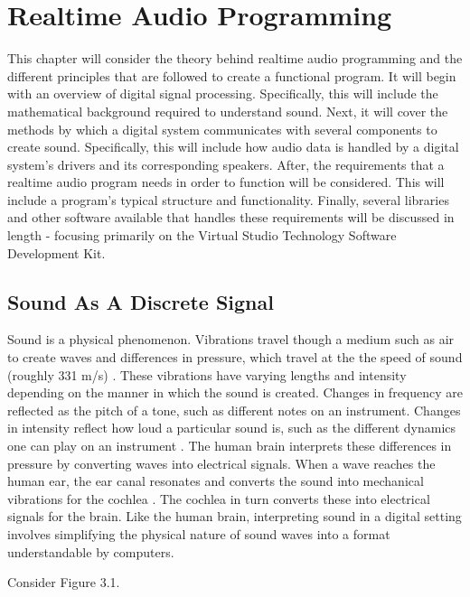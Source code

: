 \chapter{Realtime Audio Programming}
\hspace*{-0.15cm}This chapter will consider the theory behind realtime audio programming and the different principles that are followed to create a functional program. It will begin with an overview of digital signal processing. Specifically, this will include the mathematical background required to understand sound. Next, it will cover the methods by which a digital system communicates with several components to create sound. Specifically, this will include how audio data is handled by a digital system's drivers and its corresponding speakers. After, the requirements that a realtime audio program needs in order to function will be considered. This will include a program's typical structure and functionality. Finally, several libraries and other software available that handles these requirements will be discussed in length - focusing primarily on the Virtual Studio Technology Software Development Kit.

\section{Sound As A Discrete Signal}
Sound is a physical phenomenon. Vibrations travel though a medium such as air to create waves and differences in pressure, which travel at the the speed of sound (roughly 331 m/s) \cite{Ling_2016}. These vibrations have varying lengths and intensity depending on the manner in which the sound is created. Changes in frequency are reflected as the pitch of a tone, such as different notes on an instrument. Changes in intensity reflect how loud a particular sound is, such as the different dynamics one can play on an instrument \cite{Ling_2016}. The human brain interprets these differences in pressure by converting waves into electrical signals. When a wave reaches the human ear, the ear canal resonates and converts the sound into mechanical vibrations for the cochlea \cite{Ling_2016}. The cochlea in turn converts these into electrical signals for the brain. Like the human brain, interpreting sound in a digital setting involves simplifying the physical nature of sound waves into a format understandable by computers.

Consider Figure 3.1.

